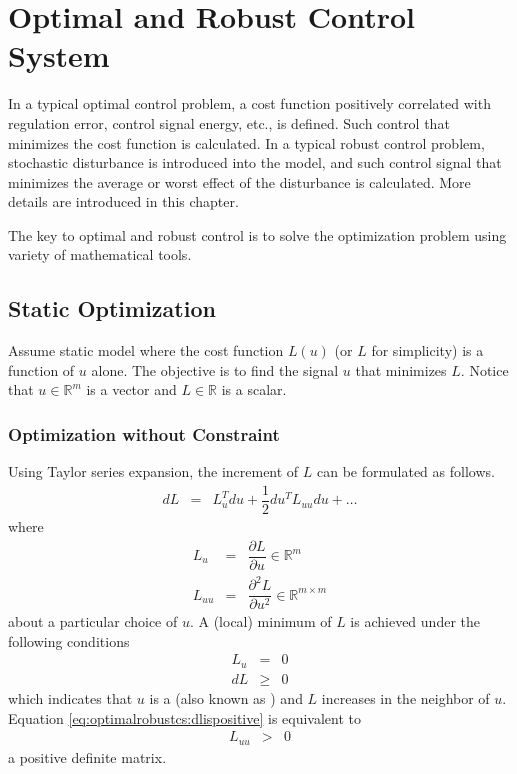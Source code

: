 \chapter{Optimal and Robust Control System} \label{ch:optimalrobustcs}

In a typical optimal control problem, a cost function positively correlated with regulation error, control signal energy, etc., is defined. Such control that minimizes the cost function is calculated. In a typical robust control problem, stochastic disturbance is introduced into the model, and such control signal that minimizes the average or worst effect of the disturbance is calculated. More details are introduced in this chapter.

The key to optimal and robust control is to solve the optimization problem using variety of mathematical tools.

\section{Static Optimization} \label{sec:optimalrobustcs:static}

Assume static model where the cost function $L(u)$ (or $L$ for simplicity) is a function of $u$ alone. The objective is to find the signal $u$ that minimizes $L$. Notice that $u\in\mathbb{R}^m$ is a vector and $L\in\mathbb{R}$ is a scalar.

\subsection{Optimization without Constraint}

Using Taylor series expansion, the increment of $L$ can be formulated as follows.
\begin{eqnarray}
	dL &=& L_u^Tdu + \dfrac{1}{2}du^TL_{uu}du + \ldots \nonumber
\end{eqnarray}
where
\begin{eqnarray}
	L_u &=& \dfrac{\partial L}{\partial u} \in \mathbb{R}^m \label{eq:lu} \\
	L_{uu} &=& \dfrac{\partial^2 L}{\partial u^2} \in \mathbb{R}^{m\times m} \nonumber
\end{eqnarray}
about a particular choice of $u$. A (local) minimum of $L$ is achieved under the following conditions
\begin{eqnarray}
	L_u &=& 0 \nonumber \\
	dL &\geq& 0 \label{eq:optimalrobustcs:dlispositive}
\end{eqnarray}
which indicates that $u$ is a  (also known as ) and $L$ increases in the neighbor of $u$. Equation \eqref{eq:optimalrobustcs:dlispositive} is equivalent to
\begin{eqnarray}
	L_{uu} &>& 0 \nonumber
\end{eqnarray}
a positive definite matrix.

